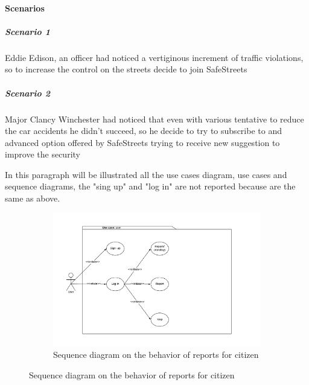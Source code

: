 \documentclass[12pt,a4paper]{report}
\begin{document}
\paragraph{Scenarios}
				\subparagraph{Scenario 1}
					Eddie Edison, an officer had noticed a vertiginous increment of traffic violations, so to increase the control
					on the streets decide to join SafeStreets
					
				\subparagraph{Scenario 2}
					Major Clancy Winchester had noticed that even with various tentative to reduce the car accidents he didn't
					succeed, so he decide to try to subscribe to and advanced option offered by SafeStreets trying to receive
					new suggestion to improve the security
					
				In this paragraph will be illustrated all the use cases diagram, use cases and sequence diagrams, the "sing up" and "log in"
				are not reported because are the same as above.
			
			\begin{figure}[H]
				\begin{subfigure}{\textwidth}
					\includegraphics[scale = 0.75, center]{UseCaseA}
					\caption{Sequence diagram on the behavior of reports for citizen}
				\end{subfigure}
			\end{figure}
			
\end{document}
